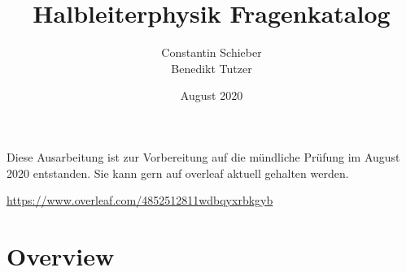\documentclass{article}
\title{Halbleiterphysik Fragenkatalog}
\author{Constantin Schieber\\Benedikt Tutzer}
\date{August 2020}
\begin{document}
\maketitle
\vfill
Diese Ausarbeitung ist zur Vorbereitung auf die m\"undliche Pr\"ufung im August 2020 entstanden. Sie kann gern auf overleaf aktuell gehalten werden.\\

\begin{center}\href{Overleaf public link}{https://www.overleaf.com/4852512811wdbqyxrbkgyb}\end{center}

\setcounter{section}{-1}
\newpage
\tableofcontents
\newpage

\section{Overview}
\end{document}
